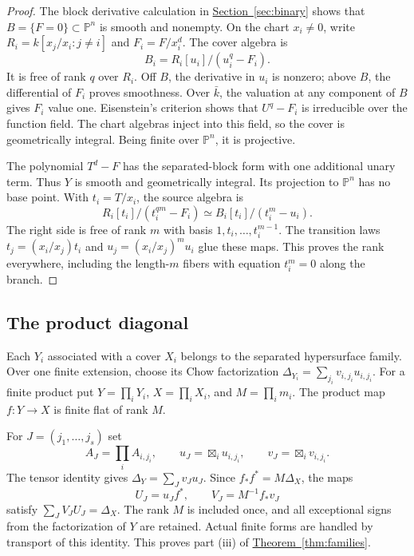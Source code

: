 \documentclass[11pt,a4paper]{article}
\theoremstyle{definition}
\theoremstyle{remark}\newtheorem{remark}[theorem]{Remark}
\numberwithin{equation}{section}
\newcommand{\PP}{\mathbb P}\newcommand{\LL}{\mathbb L}
\newcommand{\secref}[1]{\hyperref[#1]{\textcolor{sectionlink}{Section~\ref*{#1}}}}
\newcommand{\thmref}[1]{\hyperref[#1]{\textcolor{resultlink}{Theorem~\ref*{#1}}}}
\begin{document}
\begin{proof}
The block derivative calculation in \secref{sec:binary} shows
that $B=\{F=0\}\subset\PP^n$ is smooth and nonempty. On the
chart $x_i\ne0$, write $R_i=k[x_j/x_i:j\ne i]$ and
$F_i=F/x_i^d$. The cover algebra is
\[
                      B_i=R_i[u_i]/(u_i^q-F_i).
\]
It is free of rank $q$ over $R_i$. Off $B$, the derivative in
$u_i$ is nonzero; above $B$, the differential of $F_i$ proves
smoothness. Over $\bar k$, the valuation at any component of
$B$ gives $F_i$ value one. Eisenstein's criterion shows that
$U^q-F_i$ is irreducible over the function field. The chart
algebras inject into this field, so the cover is geometrically
integral. Being finite over $\PP^n$, it is projective.

The polynomial $T^d-F$ has the separated-block form with one
additional unary term. Thus $Y$ is smooth and geometrically
integral. Its projection to $\PP^n$ has no base point. With
$t_i=T/x_i$, the source algebra is
\begin{equation}\label{eq:cyclic-algebra}
 R_i[t_i]/(t_i^{qm}-F_i)\simeq B_i[t_i]/(t_i^m-u_i).
\end{equation}
The right side is free of rank $m$ with basis
$1,t_i,\ldots,t_i^{m-1}$. The transition laws
$t_j=(x_i/x_j)t_i$ and $u_j=(x_i/x_j)^m u_i$ glue these maps.
This proves the rank everywhere, including the length-$m$
fibers with equation $t_i^m=0$ along the branch.
\end{proof}

\subsection{The product diagonal}\label{proof:cyclic}

Each $Y_i$ associated with a cover $X_i$ belongs to the separated
hypersurface family. Over one finite extension, choose its Chow
factorization $\Delta_{Y_i}=\sum_{j_i}v_{i,j_i}u_{i,j_i}$.
For a finite product put
$Y=\prod_iY_i$, $X=\prod_iX_i$, and $M=\prod_i m_i$.
The product map $f:Y\to X$ is finite flat of rank $M$.

For $J=(j_1,\ldots,j_s)$ set
\[
 A_J=\prod_i A_{i,j_i},\qquad
 u_J=\boxtimes_i u_{i,j_i},\qquad v_J=\boxtimes_i v_{i,j_i}.
\]
The tensor identity gives $\Delta_Y=\sum_Jv_Ju_J$.
Since $f_*f^*=M\Delta_X$, the maps
\begin{equation}\label{eq:cyclic-diagonal}
                   U_J=u_Jf^*,\qquad V_J=M^{-1}f_*v_J
\end{equation}
satisfy $\sum_JV_JU_J=\Delta_X$. The rank $M$ is included
once, and all exceptional signs from the factorization of $Y$
are retained. Actual finite forms are handled by transport of
this identity. This proves part (iii) of \thmref{thm:families}.
\end{document}

